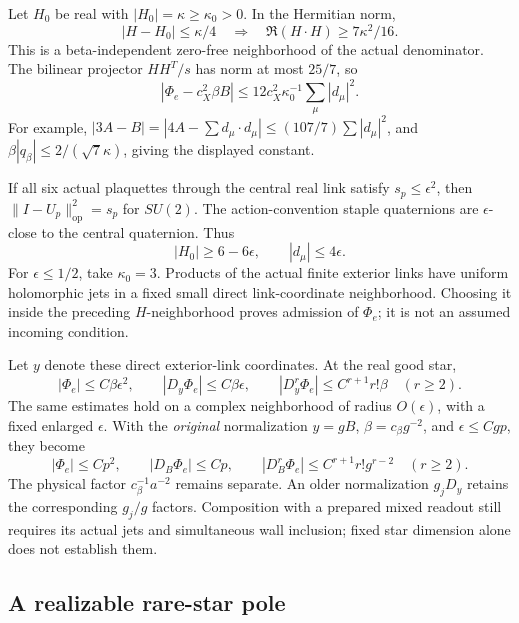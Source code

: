 \documentclass[11pt,letterpaper]{article}
\theoremstyle{remark}\newtheorem{remark}[theorem]{Remark}
\newcommand{\cB}{c_\beta}\newcommand{\dd}{\,d}
\begin{document}
Let \(H_0\) be real with \(|H_0|=\kappa\ge\kappa_0>0\). In the Hermitian norm,
\[
 |H-H_0|\le\kappa/4
 \quad\Longrightarrow\quad
 \Re(H\cdot H)\ge7\kappa^2/16.
\]
This is a beta-independent zero-free neighborhood of the actual denominator. The bilinear projector \(HH^T/s\) has norm at most \(25/7\), so
\begin{equation}\label{eq:correction}
 |\Phi_e-c_X^2\beta B|
 \le 12c_X^2\kappa_0^{-1}\sum_\mu|d_\mu|^2.
\end{equation}
For example, \(|3A-B|=|4A-\sum d_\mu\cdot d_\mu|\le(107/7)\sum|d_\mu|^2\), and
\(\beta|q_\beta|\le2/(\sqrt7\kappa)\), giving the displayed constant.

If all six actual plaquettes through the central real link satisfy
\(s_p\le\epsilon^2\), then \(\|I-U_p\|_{\mathrm{op}}^2=s_p\) for \(SU(2)\). The action-convention staple quaternions are \(\epsilon\)-close to the central quaternion. Thus
\[
 |H_0|\ge6-6\epsilon,\qquad |d_\mu|\le4\epsilon.
\]
For \(\epsilon\le1/2\), take \(\kappa_0=3\). Products of the actual finite exterior links have uniform holomorphic jets in a fixed small direct link-coordinate neighborhood. Choosing it inside the preceding \(H\)-neighborhood proves admission of \(\Phi_e\); it is not an assumed incoming condition.

Let \(y\) denote these direct exterior-link coordinates. At the real good star,
\begin{equation}\label{eq:physicaljets}
 |\Phi_e|\le C\beta\epsilon^2,\qquad
 |D_y\Phi_e|\le C\beta\epsilon,\qquad
 |D_y^r\Phi_e|\le C^{r+1}r!\beta\quad(r\ge2).
\end{equation}
The same estimates hold on a complex neighborhood of radius \(O(\epsilon)\), with a fixed enlarged \(\epsilon\). With the \emph{original} normalization
\(y=gB\), \(\beta=\cB g^{-2}\), and \(\epsilon\le Cgp\), they become
\begin{equation}\label{eq:gjets}
 \boxed{\quad
 |\Phi_e|\le Cp^2,\qquad |D_B\Phi_e|\le Cp,\qquad
 |D_B^r\Phi_e|\le C^{r+1}r!g^{r-2}\quad(r\ge2).
 \quad}
\end{equation}
The physical factor \(\cB^{-1}a^{-2}\) remains separate. An older normalization \(g_jD_y\) retains the corresponding \(g_j/g\) factors. Composition with a prepared mixed readout still requires its actual jets and simultaneous wall inclusion; fixed star dimension alone does not establish them.

\subsection{A realizable rare-star pole}
\end{document}
